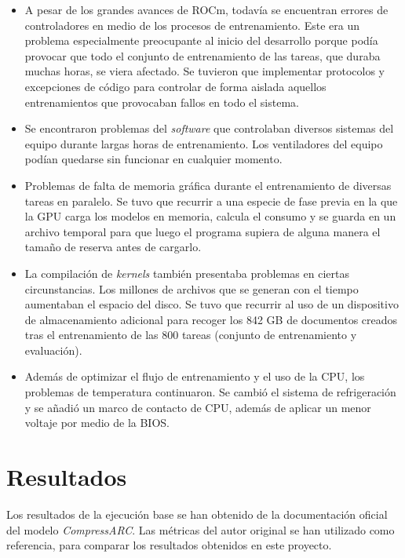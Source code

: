 \documentclass[11pt,a4paper,spanish]{book}
\numberwithin{equation}{chapter}
\numberwithin{figure}{chapter}
\begin{document}
\begin{itemize}
	\item A pesar de los grandes avances de ROCm, todavía se encuentran errores de controladores en medio de los procesos de entrenamiento. Este era un problema
	especialmente preocupante al inicio del desarrollo porque podía provocar que todo el conjunto de entrenamiento de las tareas, que duraba muchas
	horas, se viera afectado. Se tuvieron que implementar protocolos y excepciones de código para controlar de forma aislada aquellos entrenamientos
	que provocaban fallos en todo el sistema.
	\item Se encontraron problemas del \textit{software} que controlaban diversos sistemas del equipo durante largas horas de entrenamiento. 
	Los ventiladores del equipo podían quedarse sin funcionar en cualquier momento.
	\item Problemas de falta de memoria gráfica durante el entrenamiento de diversas tareas en paralelo. Se tuvo que recurrir a una especie de fase
	previa en la que la GPU carga los modelos en memoria, calcula el consumo y se guarda en un archivo temporal para que luego el programa
	supiera de alguna manera el tamaño de reserva antes de cargarlo.
	\item La compilación de \textit{kernels} también presentaba problemas en ciertas circunstancias. Los millones de archivos que se generan con
	el tiempo aumentaban el espacio del disco. Se tuvo que recurrir al uso de un dispositivo de almacenamiento adicional para recoger los 842 GB
	de documentos creados tras el entrenamiento de las 800 tareas (conjunto de entrenamiento y evaluación).
	\item Además de optimizar el flujo de entrenamiento y el uso de la CPU, los problemas de temperatura continuaron. Se cambió el sistema de
	refrigeración y se añadió un marco de contacto de CPU, además de aplicar un menor voltaje por medio de la BIOS.
\end{itemize}

\chapter{Resultados}

Los resultados de la ejecución base se han obtenido de la documentación oficial del modelo \textit{CompressARC}. Las métricas
del autor original se han utilizado como referencia, para comparar los resultados obtenidos en este proyecto.
\end{document}

